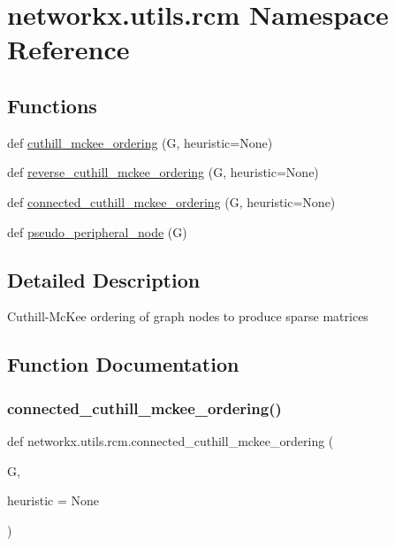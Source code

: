 \hypertarget{namespacenetworkx_1_1utils_1_1rcm}{}\section{networkx.\+utils.\+rcm Namespace Reference}
\label{namespacenetworkx_1_1utils_1_1rcm}
\subsection*{Functions}
\begin{DoxyCompactItemize}
\item 
def \hyperlink{namespacenetworkx_1_1utils_1_1rcm_a5e0d7595f93e977085ad12f692130cca}{cuthill\+\_\+mckee\+\_\+ordering} (G, heuristic=None)
\item 
def \hyperlink{namespacenetworkx_1_1utils_1_1rcm_a616827ac44a03f97a29f5fe248c14ef0}{reverse\+\_\+cuthill\+\_\+mckee\+\_\+ordering} (G, heuristic=None)
\item 
def \hyperlink{namespacenetworkx_1_1utils_1_1rcm_a8ae25da64847a2fd7f7b49801a0a1d1e}{connected\+\_\+cuthill\+\_\+mckee\+\_\+ordering} (G, heuristic=None)
\item 
def \hyperlink{namespacenetworkx_1_1utils_1_1rcm_a8af72dd56bbafa66755a2b7a30e2fc8c}{pseudo\+\_\+peripheral\+\_\+node} (G)
\end{DoxyCompactItemize}


\subsection{Detailed Description}
\begin{DoxyVerb}Cuthill-McKee ordering of graph nodes to produce sparse matrices
\end{DoxyVerb}
 

\subsection{Function Documentation}
\mbox{\label{namespacenetworkx_1_1utils_1_1rcm_a8ae25da64847a2fd7f7b49801a0a1d1e}} 
\subsubsection{\texorpdfstring{connected\+\_\+cuthill\+\_\+mckee\+\_\+ordering()}{connected\_cuthill\_mckee\_ordering()}}
{\footnotesize\ttfamily def networkx.\+utils.\+rcm.\+connected\+\_\+cuthill\+\_\+mckee\+\_\+ordering (\begin{DoxyParamCaption}\item[{}]{G,  }\item[{}]{heuristic = {\ttfamily None} }\end{DoxyParamCaption})}

